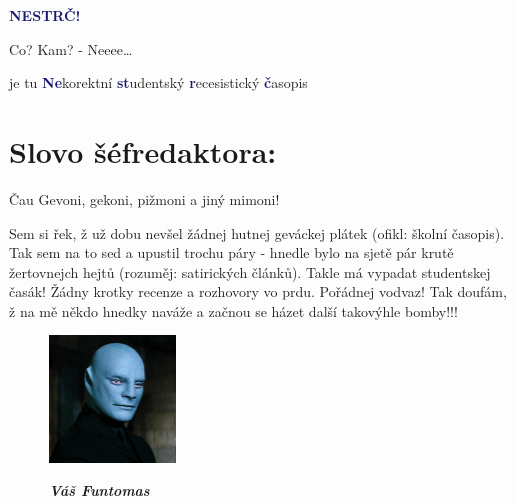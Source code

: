 \documentclass[twoside, 11pt]{article}
\begin{document}
\begin{center}
    \fontsize{40}{43}\selectfont \textcolor{MidnightBlue}{\textbf{NESTRČ!}}
 \end{center}



 \large Co? Kam? - Neeee\dots
 \vspace{-0.25cm}
 \begin{flushright}
    je tu \textcolor{MidnightBlue}{\textbf{Ne}}korektní \textcolor{MidnightBlue}{\textbf{st}}udentský \textcolor{MidnightBlue}{\textbf{r}}ecesistický \textcolor{MidnightBlue}{\textbf{č}}asopis
 \end{flushright}
 \vspace{-1cm}
 \section*{Slovo šéfredaktora:}
 Čau Gevoni, gekoni, pižmoni a jiný mimoni!

 Sem si řek, ž už dobu nevšel žádnej hutnej geváckej plátek (ofikl: školní
 časopis). Tak sem na to sed a upustil trochu páry - hnedle bylo na sjetě pár
 krutě žertovnejch hejtů (rozuměj: satirických článků). Takle má vypadat
 studentskej časák! Žádny krotky recenze a rozhovory vo prdu. Pořádnej
 vodvaz! Tak doufám, ž na mě někdo hnedky naváže a začnou se házet další
 takovýhle bomby!!!

 \begin{figure}
    \vspace*{-13pt}
    \includegraphics[width=0.3\textwidth]{funtomas}
    \vspace*{-18pt}
    \begin{flushright}
        \textit{
        \textbf{Váš Funtomas}}
    \end{flushright}
\end{figure}
\end{document}
